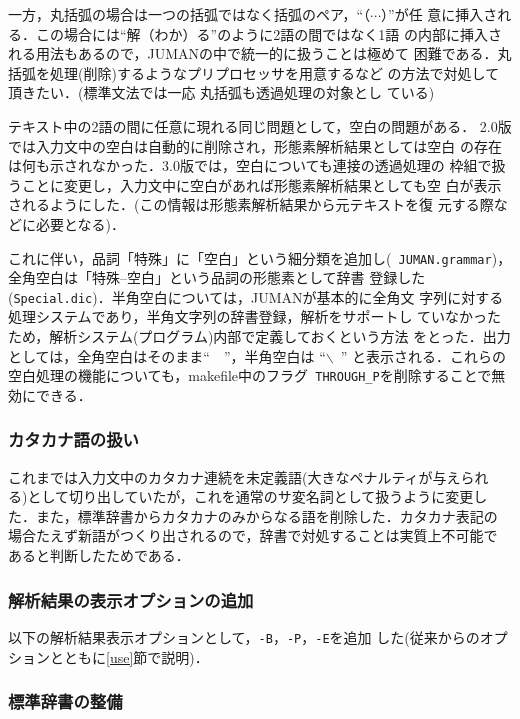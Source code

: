 \documentclass[a4j,titlepage]{jarticle}
\begin{document}
一方，丸括弧の場合は一つの括弧ではなく括弧のペア，``（$\cdots$）''が任
意に挿入される．この場合には``解（わか）る''のように2語の間ではなく1語
の内部に挿入される用法もあるので，JUMANの中で統一的に扱うことは極めて
困難である．丸括弧を処理(削除)するようなプリプロセッサを用意するなど
の方法で対処して頂きたい．(標準文法では一応 丸括弧も透過処理の対象とし
ている)

テキスト中の2語の間に任意に現れる同じ問題として，空白の問題がある．
2.0版では入力文中の空白は自動的に削除され，形態素解析結果としては空白
の存在は何も示されなかった．3.0版では，空白についても連接の透過処理の
枠組で扱うことに変更し，入力文中に空白があれば形態素解析結果としても空
白が表示されるようにした．(この情報は形態素解析結果から元テキストを復
元する際などに必要となる)．

これに伴い，品詞「特殊」に「空白」という細分類を追加し({\tt
JUMAN.grammar})，全角空白は「特殊--空白」という品詞の形態素として辞書
登録した({\tt Special.dic})．半角空白については，JUMANが基本的に全角文
字列に対する処理システムであり，半角文字列の辞書登録，解析をサポートし
ていなかったため，解析システム(プログラム)内部で定義しておくという方法
をとった．出力としては，全角空白はそのまま``　''，半角空白は
``$\backslash$\ ''
と表示される．これらの空白処理の機能についても，makefile中のフラグ{\tt
THROUGH\_P}を削除することで無効にできる．

\subsubsection{カタカナ語の扱い}

これまでは入力文中のカタカナ連続を未定義語(大きなペナルティが与えられ
る)として切り出していたが，これを通常のサ変名詞として扱うように変更し
た．また，標準辞書からカタカナのみからなる語を削除した．カタカナ表記の
場合たえず新語がつくり出されるので，辞書で対処することは実質上不可能で
あると判断したためである．

\subsubsection{解析結果の表示オプションの追加}

以下の解析結果表示オプションとして，{\tt -B}，{\tt -P}，{\tt -E}を追加
した(従来からのオプションとともに\ref{use}節で説明)．

\subsubsection{標準辞書の整備}
\end{document}
